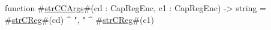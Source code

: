 function #\hyperref[sailMIPSzstrCCArgs]{strCCArgs}#(cd : CapRegEnc, c1 : CapRegEnc) -> string = #\hyperref[sailMIPSzstrCReg]{strCReg}#(cd) ^ ", " ^ #\hyperref[sailMIPSzstrCReg]{strCReg}#(c1)
